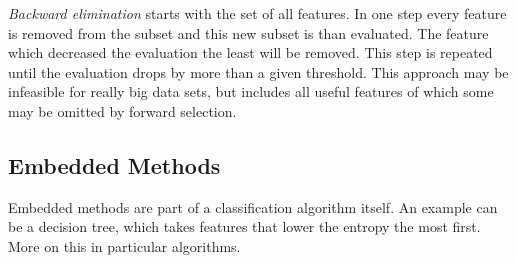 {\it Backward elimination} starts with the set of all features. In one step every feature is removed from the subset and this new subset is than evaluated. The feature which decreased the evaluation the least will be removed. This step is repeated until the evaluation drops by more than a given threshold. This approach may be infeasible for really big data sets, but includes all useful features of which some may be omitted by forward selection.




\subsection{Embedded Methods}

Embedded methods are part of a classification algorithm itself. An example can be a decision tree, which takes features that lower the entropy the most first. More on this in particular algorithms.





